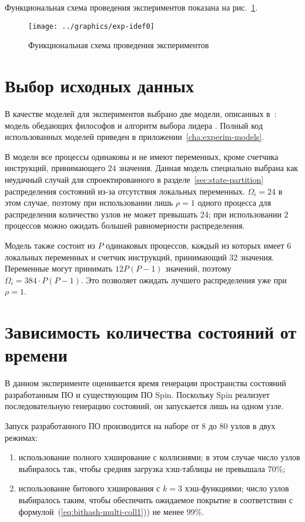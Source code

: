 Функциональная схема проведения экспериментов показана на рис.~\ref{fig:exp-idef0}.

\begin{figure}[ht]
  \centering
  \texttt{[image: ../graphics/exp-idef0]}
  \caption{Функциональная схема проведения экспериментов}
  \label{fig:exp-idef0}
\end{figure}

\section{Выбор исходных данных}
\label{sec:experiment-models}

В качестве моделей для экспериментов выбрано две модели, описанных в~\cite{SPIN}: модель
обедающих философов  и алгоритм выбора лидера . Полный код
использованных моделей приведен в приложении~\ref{cha:experim-models}.

В модели  все процессы одинаковы и не имеют переменных, кроме счетчика
инструкций, принимающего $24$ значения. Данная модель специально выбрана как неудачный
случай для спроектированного в разделе~\ref{sec:state-partition} распределения состояний
из-за отсутствия локальных переменных. $\Omega_i = 24$ в этом случае, поэтому при
использовании лишь $\rho = 1$ одного процесса для распределения количество узлов не может
превышать 24; при использовании 2 процессов можно ожидать большей равномерности
распределения.

Модель  также состоит из $P$ одинаковых процессов, каждый из которых имеет
6 локальных переменных и счетчик инструкций, принимающий 32 значения. Переменные могут
принимать $12 P (P-1)$ значений, поэтому $\Omega_i = 384\cdot P (P - 1)$. Это позволяет
ожидать лучшего распределения уже при $\rho = 1$.

\section{Зависимость количества состояний от времени}
\label{sec:space-time}

В данном эксперименте оценивается время генерации пространства состояний разработанным ПО
и существующим ПО Spin. Поскольку Spin реализует последовательную генерацию состояний, он
запускается лишь на одном узле. 

Запуск разработанного ПО производится на наборе от 8 до 80 узлов в двух режимах:
\begin{enumerate}
\item использование полного хэширование с коллизиями; в этом случае число узлов выбиралось
  так, чтобы средняя загрузка хэш-таблицы не превышала 70\%;
\item использование битового хэширования с $k = 3$ хэш-функциями; число узлов выбиралось
  таким, чтобы обеспечить ожидаемое покрытие в соответствии с
  формулой~(\ref{eq:bithash-multi-coll1})) не менее 99\%.
\end{enumerate}

